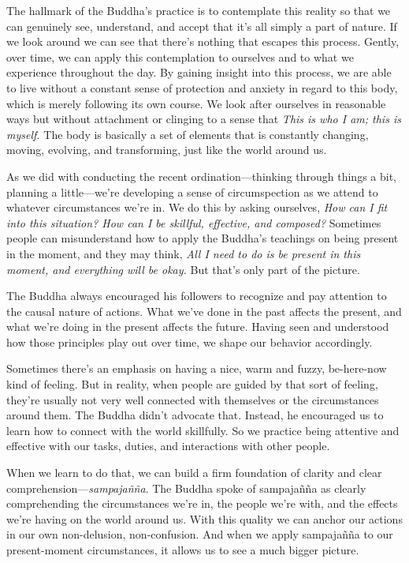 The hallmark of the Buddha's practice is to contemplate this reality so 
that we can genuinely see, understand, and accept that it's all simply 
a part of nature. If we look around we can see that there's nothing 
that escapes this process. Gently, over time, we can apply this 
contemplation to ourselves and to what we experience throughout the 
day. By gaining insight into this process, we are able to live without 
a constant sense of protection and anxiety in regard to this body, 
which is merely following its own course. We look after ourselves in 
reasonable ways but without attachment or clinging to a sense that 
\emph{This is who I am; this is myself.} The body is basically a set of 
elements that is constantly changing, moving, evolving, and 
transforming, just like the world around us.


As we did with conducting the recent ordination---thinking through 
things a bit, planning a little---we're developing a sense of 
circumspection as we attend to whatever circumstances we're in. We do 
this by asking ourselves, \emph{How can I fit into this situation? How 
can I be skillful, effective, and composed?} Sometimes people can 
misunderstand how to apply the Buddha's teachings on being present in 
the moment, and they may think, \emph{All I need to do is be present in 
this moment, and everything will be okay.} But that's only part of the 
picture.

The Buddha always encouraged his followers to recognize and pay 
attention to the causal nature of actions. What we've done in the past 
affects the present, and what we're doing in the present affects the 
future. Having seen and understood how those principles play out over 
time, we shape our behavior accordingly.

Sometimes there's an emphasis on having a nice, warm and fuzzy, 
be-here-now kind of feeling. But in reality, when people are guided by 
that sort of feeling, they're usually not very well connected with 
themselves or the circumstances around them. The Buddha didn't advocate 
that. Instead, he encouraged us to learn how to connect with the world 
skillfully. So we practice being attentive and effective with our 
tasks, duties, and interactions with other people.

When we learn to do that, we can build a firm foundation of clarity and 
clear comprehension---\emph{sampajañña}. The Buddha spoke of 
sampajañña as clearly comprehending the circumstances we're in, the 
people we're with, and the effects we're having on the world around us. 
With this quality we can anchor our actions in our own non-delusion, 
non-confusion. And when we apply sampajañña to our present-moment 
circumstances, it allows us to see a much bigger picture.

